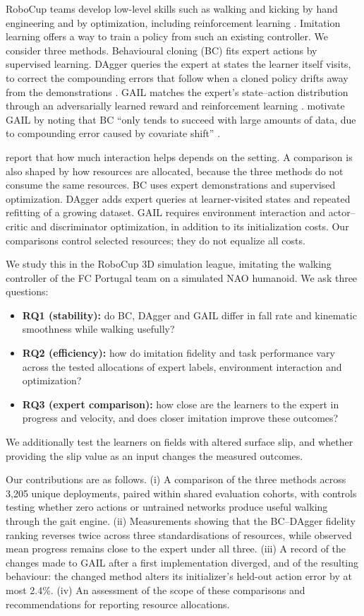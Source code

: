 \documentclass[conference]{IEEEtran}
\begin{document}
RoboCup teams develop low-level skills such as walking and kicking by hand engineering and by optimization, including reinforcement learning \citep{ingram2023,beukman2024,abreu2025}. Imitation learning offers a way to train a policy from such an existing controller. We consider three methods. Behavioural cloning (BC) fits expert actions by supervised learning. DAgger queries the expert at states the learner itself visits, to correct the compounding errors that follow when a cloned policy drifts away from the demonstrations \citep{ross2011}. GAIL matches the expert's state--action distribution through an adversarially learned reward and reinforcement learning \citep{ho2016}. \citet{ho2016} motivate GAIL by noting that BC ``only tends to succeed with large amounts of data, due to compounding error caused by covariate shift'' \citep{ho2016}.

\citet{spencer2021} report that how much interaction helps depends on the setting. A comparison is also shaped by how resources are allocated, because the three methods do not consume the same resources. BC uses expert demonstrations and supervised optimization. DAgger adds expert queries at learner-visited states and repeated refitting of a growing dataset. GAIL requires environment interaction and actor--critic and discriminator optimization, in addition to its initialization costs. Our comparisons control selected resources; they do not equalize all costs.

We study this in the RoboCup 3D simulation league, imitating the walking controller of the FC Portugal team \citep{abreu2025} on a simulated NAO humanoid. We ask three questions:
\begin{itemize}
\item \textbf{RQ1 (stability):} do BC, DAgger and GAIL differ in fall rate and kinematic smoothness while walking usefully?
\item \textbf{RQ2 (efficiency):} how do imitation fidelity and task performance vary across the tested allocations of expert labels, environment interaction and optimization?
\item \textbf{RQ3 (expert comparison):} how close are the learners to the expert in progress and velocity, and does closer imitation improve these outcomes?
\end{itemize}
We additionally test the learners on fields with altered surface slip, and whether providing the slip value as an input changes the measured outcomes.

Our contributions are as follows. (i) A comparison of the three methods across 3,205 unique deployments, paired within shared evaluation cohorts, with controls testing whether zero actions or untrained networks produce useful walking through the gait engine. (ii) Measurements showing that the BC--DAgger fidelity ranking reverses twice across three standardisations of resources, while observed mean progress remains close to the expert under all three. (iii) A record of the changes made to GAIL after a first implementation diverged, and of the resulting behaviour: the changed method alters its initializer's held-out action error by at most 2.4\%. (iv) An assessment of the scope of these comparisons and recommendations for reporting resource allocations.
\end{document}
